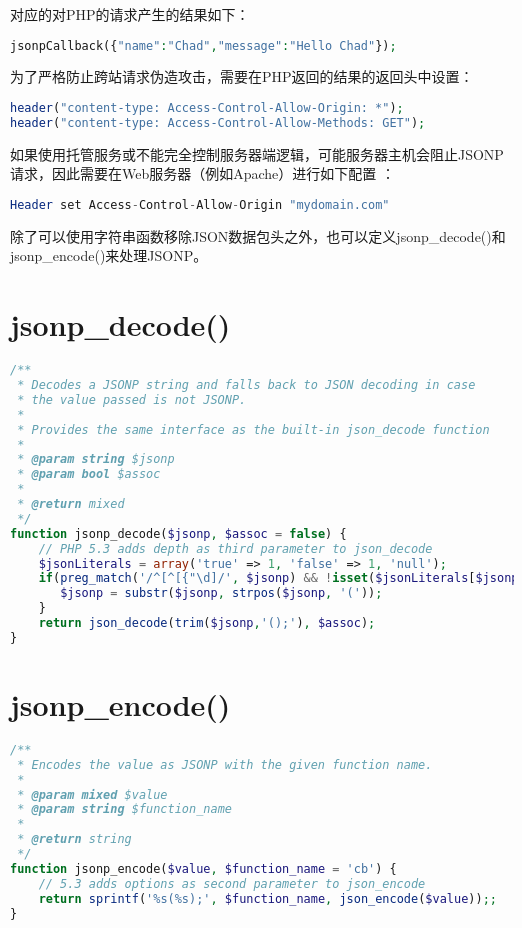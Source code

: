 对应的对PHP的请求产生的结果如下：



\begin{lstlisting}[language=PHP]
jsonpCallback({"name":"Chad","message":"Hello Chad"});
\end{lstlisting}

为了严格防止跨站请求伪造攻击，需要在PHP返回的结果的返回头中设置：


\begin{lstlisting}[language=PHP]
header("content-type: Access-Control-Allow-Origin: *");
header("content-type: Access-Control-Allow-Methods: GET");
\end{lstlisting}

如果使用托管服务或不能完全控制服务器端逻辑，可能服务器主机会阻止JSONP请求，因此需要在Web服务器（例如Apache）进行如下配置 ：

\begin{lstlisting}[language=PHP]
Header set Access-Control-Allow-Origin "mydomain.com"
\end{lstlisting}

除了可以使用字符串函数移除JSON数据包头之外，也可以定义jsonp\_decode()和jsonp\_encode()来处理JSONP。

\section{jsonp\_decode()}

\begin{lstlisting}[language=PHP]
/**
 * Decodes a JSONP string and falls back to JSON decoding in case
 * the value passed is not JSONP.
 * 
 * Provides the same interface as the built-in json_decode function
 *
 * @param string $jsonp
 * @param bool $assoc
 *
 * @return mixed
 */
function jsonp_decode($jsonp, $assoc = false) { 
    // PHP 5.3 adds depth as third parameter to json_decode
    $jsonLiterals = array('true' => 1, 'false' => 1, 'null');
    if(preg_match('/^[^[{"\d]/', $jsonp) && !isset($jsonLiterals[$jsonp])) { // we have JSONP
       $jsonp = substr($jsonp, strpos($jsonp, '('));
    }
    return json_decode(trim($jsonp,'();'), $assoc);
}
\end{lstlisting}


\section{jsonp\_encode()}

\begin{lstlisting}[language=PHP]
/**
 * Encodes the value as JSONP with the given function name.
 *
 * @param mixed $value
 * @param string $function_name
 *
 * @return string
 */
function jsonp_encode($value, $function_name = 'cb') { 
    // 5.3 adds options as second parameter to json_encode
    return sprintf('%s(%s);', $function_name, json_encode($value));;
}
\end{lstlisting}


